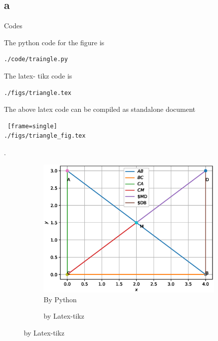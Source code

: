 \documentclass{beamer}
\begin{document}
\subsection{a}
\begin{frame}[fragile]
\tiny
\begin{block}{Codes}
\begin{flushleft}
The python code for the figure is
\begin{lstlisting}[frame=single]
./code/traingle.py
\end{lstlisting}
The latex- tikz code is
\begin{lstlisting}[frame=single]
./figs/triangle.tex
\end{lstlisting}
The above latex code can be compiled as standalone document
\begin{lstlisting} [frame=single]
./figs/triangle_fig.tex
\end{lstlisting}
\end{flushleft}
\end{block}.
\begin{figure}
\begin{flushleft}


\begin{subfigure}{0.2\textwidth}
\includegraphics[scale=0.275]{./figs/triangle.eps}
\caption{\tiny By Python}
\end{subfigure}
%
\begin{subfigure}{0.65\textwidth}
\begin{flushright}

\caption{\tiny by Latex-tikz}
\end{flushright}
\end{subfigure}
\end{flushleft}
%
\end{figure}
\end{frame}
\end{document}
